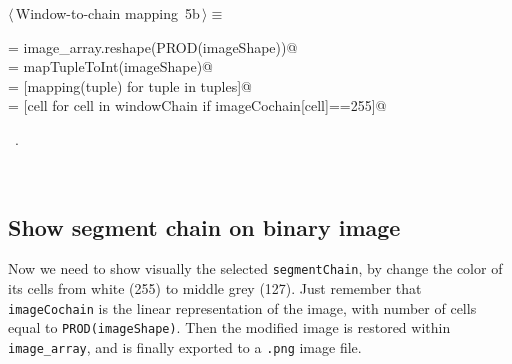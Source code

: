 \documentclass[11pt,oneside]{article}	%
\begin{document}
\begin{flushleft} \small
\begin{minipage}{\linewidth} \label{scrap7}
\protect{}$\langle\,$Window-to-chain mapping\nobreak\ {\footnotesize 5b}$\,\rangle\equiv$
\vspace{-1ex}
\begin{list}{}{} \item
\mbox{}\verb@imageCochain = image_array.reshape(PROD(imageShape))@\\
\mbox{}\verb@mapping = mapTupleToInt(imageShape)@\\
\mbox{}\verb@windowChain = [mapping(tuple) for tuple in tuples]@\\
\mbox{}\verb@segmentChain = [cell for cell in windowChain if imageCochain[cell]==255]@\\
\mbox{}\verb@@{\NWsep}
\end{list}
\vspace{-1ex}
\footnotesize\addtolength{\baselineskip}{-1ex}
\begin{list}{}{\setlength{\itemsep}{-\parsep}\setlength{\itemindent}{-\leftmargin}}
\item \NWtxtMacroRefIn\ .
\end{list}
\end{minipage}\\[4ex]
\end{flushleft}

\subsection{Show segment chain on binary image}

Now we need to show visually the selected \texttt{segmentChain}, by change the color of its cells from white (255) to middle grey (127). Just remember that \texttt{imageCochain} is the linear representation of the image, with number of cells equal to \texttt{PROD(imageShape)}. Then the modified image is restored within \texttt{image\_array}, and is finally exported to a \texttt{.png} image file.
\end{document}
